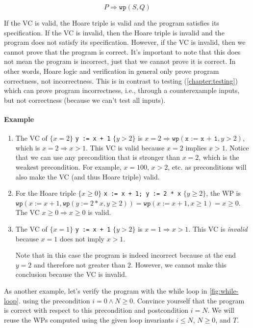 \documentclass[oneside,11pt,dvipsnames]{book}
\renewcommand{\implies}{\Rightarrow}
\newcommand{\code}[1]{\texttt{#1}}
\begin{document}
\[P \implies \code{wp}(S,Q)\]

If the VC is valid, the Hoare triple is valid and the program satisfies its specification.  If the VC is invalid, then the Hoare triple is invalid and the program does not satisfy its specification.
However, if the VC is invalid, then we cannot prove that the program is correct.  It's important to note that this does not mean the program is incorrect, just that we cannot prove it is correct.  In other words, Hoare logic and verification in general only prove program correctness, not incorrectness.  This is in contrast to testing (\autoref{chapter:testing}) which can prove program incorrectness, i.e., through a counterexample inputs, but not correctness (because we can't test all inputs).

\paragraph{Example} 

\begin{enumerate}
\item The VC of $\{x = 2\}$ \code{y := x + 1} $\{y > 2\}$ is $x = 2 \implies \code{wp}(\code{x := x + 1}, y > 2)$, which is $x = 2 \implies x > 1$.  This VC is valid because $x = 2$ implies $x  > 1$.  Notice that we can use any precondition that is stronger than $x = 2$, which is the weakest precondition.  For example, $x = 100$, $x > 2$, etc. as preconditions will also make the VC (and thus Hoare triple) valid.

\item For the Hoare triple $\{x \ge 0\}$ \code{x := x + 1; y := 2 * x} $\{y \ge 2\}$, the WP is $\code{wp}(x := x + 1, \code{wp}(y := 2 * x, y \ge 2)) = \code{wp}(x := x + 1, x \ge 1) = x \ge 0 $.  The VC $x \ge 0 \implies x  \ge 0$ is valid.


\item The VC of $\{x = 1\}$ \code{y := x + 1} $\{y > 2\}$ is $x = 1 \implies x > 1$.  This VC is \emph{invalid} because $x = 1$ does not imply $x  > 1$.

Note that in this case the program is indeed incorrect because at the end $y = 2$ and therefore not greater than 2. However, we cannot make this conclusion because the VC is invalid. 

\end{enumerate}


As another example, let's verify the program with the while loop in \autoref{fig:while-loop}.  
using the precondition $i = 0 \land N \ge 0$.  Convince yourself that the program is correct with respect to this precondition and postcondition $i = N$. We will reuse the WPs computed using the given loop invariants $i \le N$, $N \ge 0$, and $T$.  
\end{document}
